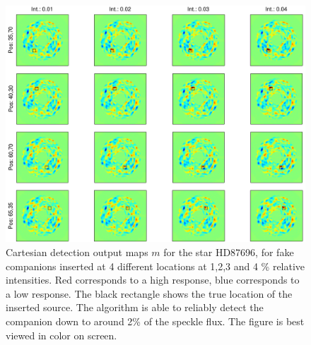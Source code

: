 \documentclass[12pt,pdftex,preprint]{aastex}
\begin{document}
\begin{figure}[h!]
\begin{center}
\includegraphics[width=6in]{figs/maps.pdf}
\end{center}
\vspace{-7mm}
\caption{Cartesian detection output maps $m$ for the star HD87696, for fake
 companions inserted at 4 different locations at 1,2,3 and 4 \%
 relative intensities. Red corresponds to a high response, blue
 corresponds to a low response. The black rectangle shows the true location of
the inserted source. The algorithm is able to reliably detect the
companion down to around 2\% of the speckle flux. The figure is best viewed in color on screen. }
\label{fig:maps_hd87696}
\end{figure}
\end{document}
